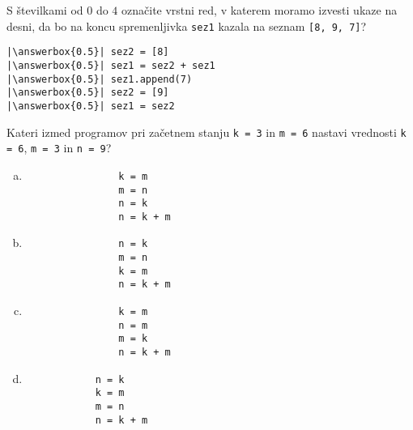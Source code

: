 \documentclass[arhiv, 10pt]{../izpit}
\newcommand{\inlinepy}[1]{\texttt{#1}}
\newcommand{\answerbox}[1]{\framebox{\vphantom{\large M}\hspace{#1cm}}}
\begin{document}
        \naloga*
        \begin{multicols}{2}
        \noindent 
        S številkami od $0$ do $4$ označite vrstni red, v katerem moramo izvesti ukaze na desni, da bo na koncu spremenljivka \inlinepy{sez1} kazala na seznam \inlinepy{[8, 9, 7]}?
    
        \columnbreak
        \noindent
        \begin{verbatim}
|\answerbox{0.5}| sez2 = [8]
|\answerbox{0.5}| sez1 = sez2 + sez1
|\answerbox{0.5}| sez1.append(7)
|\answerbox{0.5}| sez2 = [9]
|\answerbox{0.5}| sez1 = sez2

        \end{verbatim}
        \end{multicols}
    
            
        \naloga*
        
        Kateri izmed programov pri začetnem stanju
            \inlinepy{k = 3} in
            \inlinepy{m = 6}
        nastavi vrednosti
            \inlinepy{k = 6},
            \inlinepy{m = 3} in
            \inlinepy{n = 9}?
    
        \begin{multicols}{4}
        \begin{enumerate}[(a)]
\item 
                \begin{verbatim}
                k = m
                m = n
                n = k
                n = k + m
                \end{verbatim}
            
\item 
                \begin{verbatim}
                n = k
                m = n
                k = m
                n = k + m
                \end{verbatim}
            
\item 
                \begin{verbatim}
                k = m
                n = m
                m = k
                n = k + m
                \end{verbatim}
            
\item 
            \begin{verbatim}
            n = k
            k = m
            m = n
            n = k + m
            \end{verbatim}
        
\end{enumerate}

        \end{multicols}
    
\end{document}
